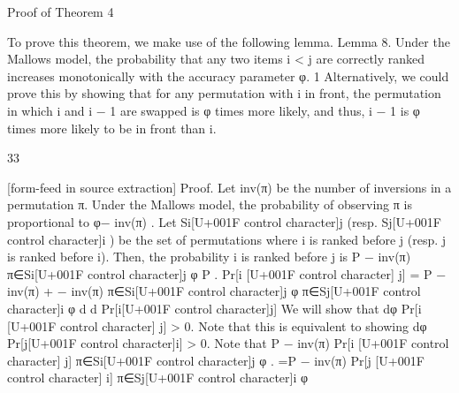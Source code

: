 \documentclass[10pt]{article}
\begin{document}
\begin{ReviewVerbatim}

Proof of Theorem 4

To prove this theorem, we make use of the following lemma.
Lemma 8. Under the Mallows model, the probability that any two items i < j are correctly ranked increases
monotonically with the accuracy parameter φ.
1 Alternatively, we could prove this by showing that for any permutation with i in front, the permutation in which i and i − 1
are swapped is φ times more likely, and thus, i − 1 is φ times more likely to be in front than i.

33


[form-feed in source extraction]
Proof. Let inv(π) be the number of inversions in a permutation π. Under the Mallows model, the probability
of observing π is proportional to φ− inv(π) . Let Si[U+001F control character]j (resp. Sj[U+001F control character]i ) be the set of permutations where i is ranked
before j (resp. j is ranked before i). Then, the probability i is ranked before j is
P
− inv(π)
π∈Si[U+001F control character]j φ
P
.
Pr[i [U+001F control character] j] = P
− inv(π) +
− inv(π)
π∈Si[U+001F control character]j φ
π∈Sj[U+001F control character]i φ
d
d Pr[i[U+001F control character]j]
We will show that dφ
Pr[i [U+001F control character] j] > 0. Note that this is equivalent to showing dφ
Pr[j[U+001F control character]i] > 0. Note that
P
− inv(π)
Pr[i [U+001F control character] j]
π∈Si[U+001F control character]j φ
.
=P
− inv(π)
Pr[j [U+001F control character] i]
π∈Sj[U+001F control character]i φ


\end{ReviewVerbatim}
\end{document}
